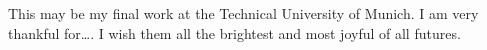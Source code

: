 \thispagestyle{empty}
\vspace*{20mm}

\begin{center}
\textbf{{\abstractname}}
\end{center}

\vspace{10mm}

This may be my final work at the Technical University of Munich. I am very thankful for\ldots. I wish them all the brightest and most joyful of all futures.

\cleardoublepage{}
